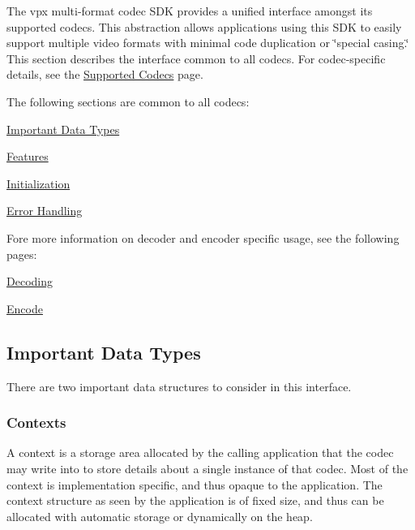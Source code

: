 The vpx multi-\/format codec S\-D\-K provides a unified interface amongst its supported codecs. This abstraction allows applications using this S\-D\-K to easily support multiple video formats with minimal code duplication or \char`\"{}special casing.\char`\"{} This section describes the interface common to all codecs. For codec-\/specific details, see the \hyperlink{group__codecs}{Supported Codecs} page.

The following sections are common to all codecs\-:
\begin{DoxyItemize}
\item \hyperlink{usage_usage_types}{Important Data Types}
\item \hyperlink{usage_usage_features}{Features}
\item \hyperlink{usage_usage_init}{Initialization}
\item \hyperlink{usage_usage_errors}{Error Handling}
\end{DoxyItemize}

Fore more information on decoder and encoder specific usage, see the following pages\-:
\begin{DoxyItemize}
\item \hyperlink{usage_decode}{Decoding}
\begin{DoxyItemize}
\item \hyperlink{usage_encode}{Encode}
\end{DoxyItemize}
\end{DoxyItemize}\hypertarget{usage_usage_types}{}\subsection{Important Data Types}\label{usage_usage_types}
There are two important data structures to consider in this interface.\hypertarget{usage_usage_ctxs}{}\subsubsection{Contexts}\label{usage_usage_ctxs}
A context is a storage area allocated by the calling application that the codec may write into to store details about a single instance of that codec. Most of the context is implementation specific, and thus opaque to the application. The context structure as seen by the application is of fixed size, and thus can be allocated with automatic storage or dynamically on the heap.

